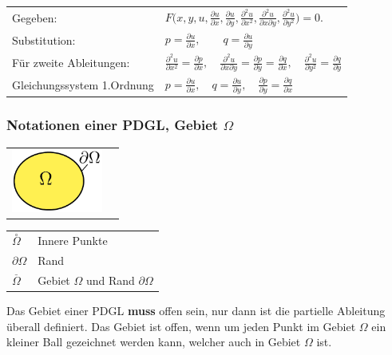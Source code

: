 \begin{tabular}{ll}
Gegeben:& $F\biggl(x,y,u,\frac{\partial u}{\partial x},\frac{\partial u}{\partial y},
\frac{\partial^2 u}{\partial x^2},\frac{\partial^2 u}{\partial x\partial y},
\frac{\partial^2u}{\partial y^2}\biggr)=0.$\\[0.2cm]
Substitution: & $p=\frac{\partial u}{\partial x},\qquad q=\frac{\partial u}{\partial y}$\\[0.2cm]
Für zweite Ableitungen: & $\frac{\partial^2 u}{\partial x^2}=\frac{\partial p}{\partial x},\quad \frac{\partial^2 u}{\partial x\partial y}=\frac{\partial p}{\partial y}=\frac{\partial q}{\partial x},\quad\frac{\partial^2 u}{\partial y^2}=\frac{\partial q}{\partial y}$\\[0.2cm]
Gleichungssystem 1.Ordnung& $p=\frac{\partial u}{\partial x},\quad q=\frac{\partial u}{\partial y},\quad\frac{\partial p}{\partial y}=\frac{\partial q}{\partial x}$
\end{tabular}

\subsubsection{Notationen einer PDGL, Gebiet $\Omega$}
\begin{minipage}{4cm}
	\begin{tabular}{ll}
	\includegraphics[width=3cm]{Content/Theory/Gebiet}&
	\end{tabular}
\end{minipage}
\begin{minipage}{4cm}	
	\begin{tabular}{ll}
		$\overset{\circ}{\Omega}$ & Innere Punkte\\
		$\partial\Omega$ & Rand\\
		$\overset{\_}{\Omega}$ & Gebiet $\Omega$ und Rand $\partial\Omega$\\
	\end{tabular}
\end{minipage}

Das Gebiet einer PDGL \textbf{muss} offen sein, nur dann ist die partielle Ableitung überall definiert. Das Gebiet ist offen, wenn um jeden Punkt im Gebiet $\Omega$ ein kleiner Ball gezeichnet werden kann, welcher auch in Gebiet $\Omega$ ist.

